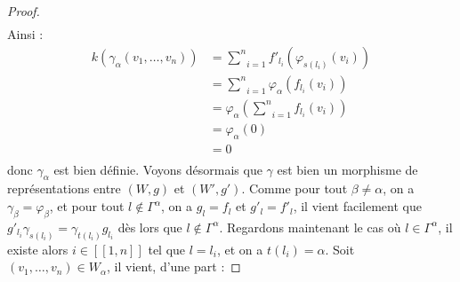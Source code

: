 \documentclass[a4paper,10pt]{article}
\begin{document}
\begin{proof}
\[\begin{array}{lccc}
\end{array}
	\]
Ainsi :
\[
\begin{array}{rl}
	k(\gamma_{\alpha}(v_{1},\dots,v_{n})) & = \underset{i=1}{\overset{n}{\sum}}f'_{l_{i}}(\varphi_{s(l_{i})}(v_{i})) \\ 
	& = \underset{i=1}{\overset{n}{\sum}} \varphi_{\alpha}(f_{l_{i}}(v_{i}))\\
	& = \varphi_{\alpha}(\underset{i=1}{\overset{n}{\sum}}f_{l_{i}}(v_{i}))\\
	& = \varphi_{\alpha}(0) \\
	& = 0 \\
\end{array}
\]
donc $\gamma_{\alpha}$ est bien définie. Voyons désormais que $\gamma$ est bien un morphisme de représentations entre $(W,g)$ et $(W',g')$. Comme pour tout $\beta\neq\alpha$, on a $\gamma_{\beta}=\varphi_{\beta}$, et pour tout $l\notin\Gamma^{\alpha}$, on a $g_{l}=f_{l}$ et $g'_{l}=f'_{l}$, il vient facilement que $g'_{l_{i}}\gamma_{s(l_{i})}=\gamma_{t(l_{i})}g_{l_{i}}$ dès lors que $l\notin\Gamma^{\alpha}$. Regardons maintenant le cas où $l\in\Gamma^{\alpha}$, il existe alors $i\in[\![1,n]\!]$ tel que $l=l_{i}$, et on a $t(l_{i})=\alpha$. Soit $(v_{1},\dots,v_{n})\in W_{\alpha}$, il vient, d'une part :


\end{proof}
\end{document}
